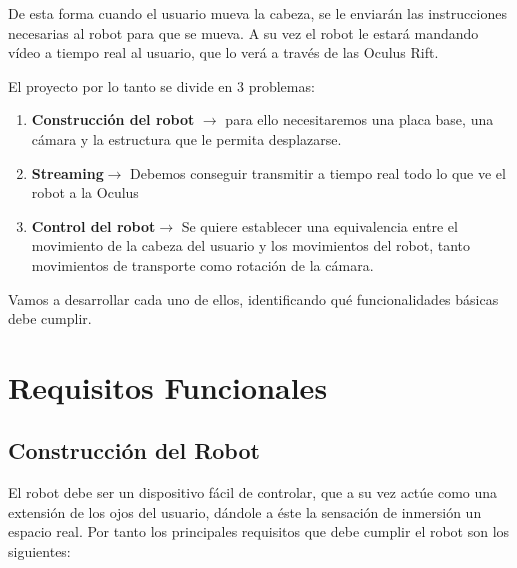 \documentclass[twoside, 11pt]{epstfg}
\begin{document}
De esta forma cuando el usuario mueva la cabeza, se le enviarán las instrucciones necesarias al robot para que se mueva. A su vez el robot le estará mandando vídeo a tiempo real al usuario, que lo verá a través de las Oculus Rift.


El proyecto por lo tanto se divide en 3 problemas:
\begin{enumerate}
	\item \textbf{Construcción del robot} $\rightarrow$ para ello necesitaremos una placa base, una cámara y la estructura que le permita desplazarse.
	\item \textbf{Streaming}$\rightarrow$ Debemos conseguir transmitir a tiempo real todo lo que ve el robot a la Oculus
	\item \textbf{Control del robot}$\rightarrow$ Se quiere establecer una equivalencia entre el movimiento de la cabeza del usuario y los movimientos del robot, tanto movimientos de transporte como rotación de la cámara.
\end{enumerate}

Vamos a desarrollar cada uno de ellos, identificando qué funcionalidades básicas debe cumplir.

\section{Requisitos Funcionales}

\subsection{Construcción del Robot}


El robot debe ser un dispositivo fácil de controlar, que a su vez actúe como una extensión de los ojos del usuario, dándole a éste la sensación de inmersión un espacio real.
Por tanto los principales requisitos que debe cumplir el robot son los siguientes:
\end{document}
